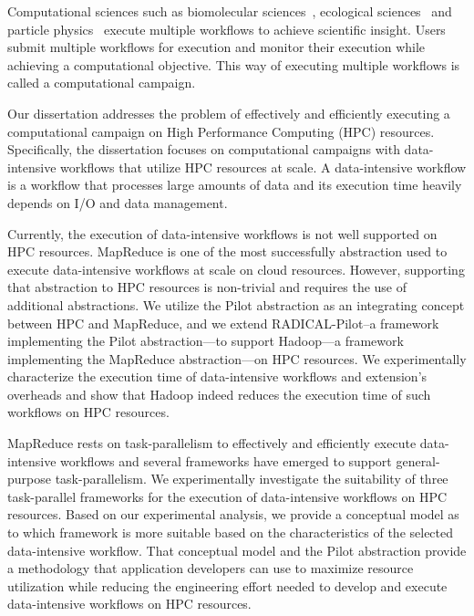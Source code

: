 Computational sciences such as biomolecular sciences~\cite{cheatham2015impact,
dakka2018concurrent}, ecological sciences~\cite{goncalves2020sealnet,
paraskevakos2019workflow} and particle physics~\cite{atlas} execute multiple
workflows to achieve scientific insight. Users submit multiple workflows for
execution and monitor their execution while achieving a computational objective.
This way of executing multiple workflows is called a computational campaign.

Our dissertation addresses the problem of effectively and efficiently executing
a computational campaign on High Performance Computing (HPC) resources.
Specifically, the dissertation focuses on computational campaigns with
data-intensive workflows that utilize HPC resources at scale. A data-intensive
workflow is a workflow that processes large amounts of data and its execution
time heavily depends on I/O and data management.

Currently, the execution of data-intensive workflows is not well supported on
HPC resources. MapReduce is one of the most successfully abstraction used to
execute data-intensive workflows at scale on cloud resources. However,
supporting that abstraction to HPC resources is non-trivial and requires the
use of additional abstractions. We utilize the Pilot abstraction as an
integrating concept between HPC and MapReduce, and we extend RADICAL-Pilot--a
framework implementing the Pilot abstraction---to support Hadoop---a framework
implementing the MapReduce abstraction---on HPC resources. We experimentally
characterize the execution time of data-intensive workflows and extension's
overheads and show that Hadoop indeed reduces the execution time of such
workflows on HPC resources.


MapReduce rests on task-parallelism to effectively and efficiently execute
data-intensive workflows and several frameworks have emerged to support
general-purpose task-parallelism. We experimentally investigate the suitability
of three task-parallel frameworks for the execution of data-intensive workflows
on HPC resources. Based on our experimental analysis, we provide a conceptual
model as to which framework is more suitable based on the characteristics of the
selected data-intensive workflow. That conceptual model and the Pilot
abstraction provide a methodology that application developers can use to
maximize resource utilization while reducing the engineering effort needed to
develop and execute data-intensive workflows on HPC resources.

